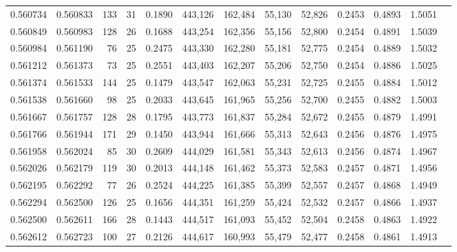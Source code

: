 \begin{tabular}{rrrrrrrrrrrrr}
0.560734 & 0.560833 &    133 &    31 &                                     0.1890 & 443,126 & 162,484 &  55,130 &  52,826 & 0.2453 & 0.4893 & 1.5051 \\
0.560849 & 0.560983 &    128 &    26 &                                     0.1688 & 443,254 & 162,356 &  55,156 &  52,800 & 0.2454 & 0.4891 & 1.5039 \\
0.560984 & 0.561190 &     76 &    25 &                                     0.2475 & 443,330 & 162,280 &  55,181 &  52,775 & 0.2454 & 0.4889 & 1.5032 \\
0.561212 & 0.561373 &     73 &    25 &                                     0.2551 & 443,403 & 162,207 &  55,206 &  52,750 & 0.2454 & 0.4886 & 1.5025 \\
0.561374 & 0.561533 &    144 &    25 &                                     0.1479 & 443,547 & 162,063 &  55,231 &  52,725 & 0.2455 & 0.4884 & 1.5012 \\
0.561538 & 0.561660 &     98 &    25 &                                     0.2033 & 443,645 & 161,965 &  55,256 &  52,700 & 0.2455 & 0.4882 & 1.5003 \\
0.561667 & 0.561757 &    128 &    28 &                                     0.1795 & 443,773 & 161,837 &  55,284 &  52,672 & 0.2455 & 0.4879 & 1.4991 \\
0.561766 & 0.561944 &    171 &    29 &                                     0.1450 & 443,944 & 161,666 &  55,313 &  52,643 & 0.2456 & 0.4876 & 1.4975 \\
0.561958 & 0.562024 &     85 &    30 &                                     0.2609 & 444,029 & 161,581 &  55,343 &  52,613 & 0.2456 & 0.4874 & 1.4967 \\
0.562026 & 0.562179 &    119 &    30 &                                     0.2013 & 444,148 & 161,462 &  55,373 &  52,583 & 0.2457 & 0.4871 & 1.4956 \\
0.562195 & 0.562292 &     77 &    26 &                                     0.2524 & 444,225 & 161,385 &  55,399 &  52,557 & 0.2457 & 0.4868 & 1.4949 \\
0.562294 & 0.562500 &    126 &    25 &                                     0.1656 & 444,351 & 161,259 &  55,424 &  52,532 & 0.2457 & 0.4866 & 1.4937 \\
0.562500 & 0.562611 &    166 &    28 &                                     0.1443 & 444,517 & 161,093 &  55,452 &  52,504 & 0.2458 & 0.4863 & 1.4922 \\
0.562612 & 0.562723 &    100 &    27 &                                     0.2126 & 444,617 & 160,993 &  55,479 &  52,477 & 0.2458 & 0.4861 & 1.4913 \\

\end{tabular}
